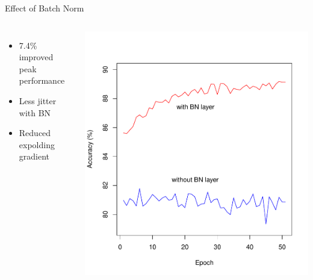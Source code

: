 \documentclass[aspectratio=1610, 12pt]{beamer}
\begin{document}
\begin{frame}{Effect of Batch Norm}
 	\begin{columns}
 		\begin{itemize}
 			\item 7.4\% improved peak performance
 			\item Less jitter with BN
 			\item Reduced expolding gradient
 		\end{itemize}
 		
 		\centering
 		\includegraphics[scale=0.45]{images/batchnorm_measurement.pdf}
 	\end{columns}
\end{frame}
\end{document}
